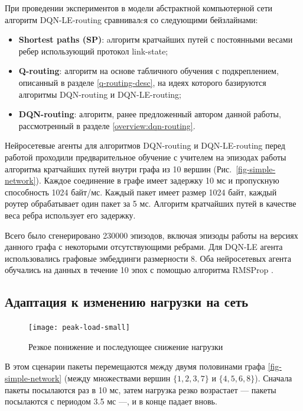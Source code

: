 \documentclass[specification,annotation,times]{itmo-student-thesis}
\theoremstyle{definition}
\begin{document}
При проведении экспериментов в модели абстрактной компьютерной сети алгоритм
DQN-LE-routing сравнивалcя со следующими бейзлайнами:

\begin{itemize}
  \item \textbf{Shortest paths (SP)}: aлгоритм кратчайших путей с постоянными
    весами ребер использующий протокол link-state;
  \item \textbf{Q-routing}: алгоритм на основе табличного обучения с
    подкреплением, описанный в разделе \ref{q-routing-desc}, на идеях которого
    базируются алгоритмы DQN-routing и DQN-LE-routing;
  \item \textbf{DQN-routing}: алгоритм, ранее предложенный автором данной
    работы, рассмотренный в разделе \ref{overview:dqn-routing}.
\end{itemize}

Нейросетевые агенты для алгоритмов DQN-routing и DQN-LE-routing перед работой
проходили предварительное обучение с учителем на эпизодах работы алгоритма
кратчайших путей внутри графа из 10 вершин (Рис.~\ref{fig-simple-network}).
Каждое соединение в графе имеет задержку 10 мс и пропускную способность 1024 байт/мс.
Каждый пакет имеет размер 1024 байт, каждый роутер обрабатывает один пакет за 5
мс. Алгоритм кратчайших путей в качестве веса ребра использует его задержку.

Всего было сгенерировано 230000 эпизодов, включая эпизоды работы на версиях
данного графа с некоторыми отсутствующими ребрами. Для DQN-LE агента
использовались графовые эмбеддинги размерности 8. Оба нейросетевых агента
обучались на данных в течение 10 эпох с помощью алгоритма RMSProp \cite{tieleman2012lecture}.

\subsection{Адаптация к изменению нагрузки на сеть}

\begin{figure}[!h]
  \caption{Резкое понижение и последующее снижение нагрузки}\label{experiments:network:peak-load-small}
  \centering
  \texttt{[image: peak-load-small]}
\end{figure}

В этом сценарии пакеты перемещаются между двумя половинами
графа \ref{fig-simple-network} (между множествами вершин $\{1, 2, 3, 7\}$ и
$\{4, 5, 6, 8\}$). Сначала пакеты посылаются раз в 10 мс, затем нагрузка резко
возрастает --- пакеты посылаются с периодом 3.5 мс ---, и в конце падает вновь.
\end{document}
